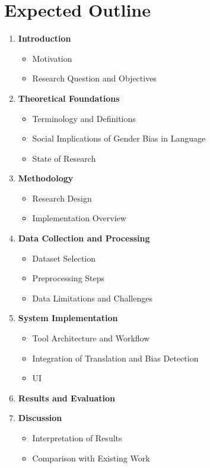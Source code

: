 \documentclass[oneside, paper=A4, DIV=15]{scrartcl}
\begin{document}
\section{Expected Outline}
\begin{enumerate}
  \item \textbf{Introduction}
    \begin{itemize}
      \item Motivation
      \item Research Question and Objectives
    \end{itemize}

  \item \textbf{Theoretical Foundations}
    \begin{itemize}
      \item Terminology and Definitions
      \item Social Implications of Gender Bias in Language
      \item State of Research
    \end{itemize}

  \item \textbf{Methodology}
    \begin{itemize}
      \item Research Design
      \item Implementation Overview
    \end{itemize}

  \item \textbf{Data Collection and Processing}
    \begin{itemize}
      \item Dataset Selection
      \item Preprocessing Steps
      \item Data Limitations and Challenges
    \end{itemize}

  \item \textbf{System Implementation}
    \begin{itemize}
      \item Tool Architecture and Workflow
      \item Integration of Translation and Bias Detection
      \item UI
    \end{itemize}

  \item \textbf{Results and Evaluation}

  \item \textbf{Discussion}
    \begin{itemize}
      \item Interpretation of Results
      \item Comparison with Existing Work
    \end{itemize}


\end{enumerate}
\end{document}
